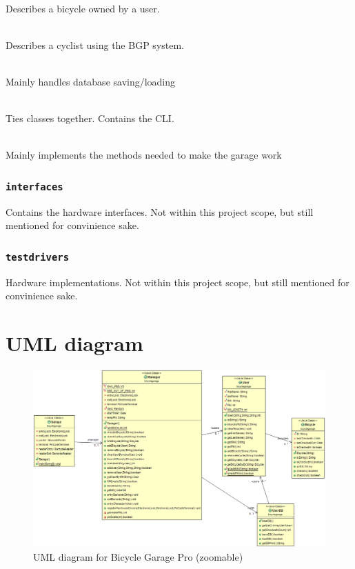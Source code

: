 \documentclass[12pt,titlepage]{article}
\begin{document}
\begin{description}[font=\normalfont]
	\item [\texttt{Bicycle}]	\hfill \\
		Describes a bicycle owned by a user.

	\item [\texttt{User}]		\hfill \\
		Describes a cyclist using the BGP system.

	\item [\texttt{UserDB}]		\hfill \\
		Mainly handles database saving/loading

	\item [\texttt{Garage}]		\hfill \\
		Ties classes together. Contains the CLI.

	\item [\texttt{Manager}]	\hfill \\
		Mainly implements the methods needed to make the garage work

\end{description}


\subsubsection{\texttt{interfaces}}
Contains the hardware interfaces. Not within this project scope, but still mentioned for convinience sake.
\subsubsection{\texttt{testdrivers}}
Hardware implementations. Not within this project scope, but still mentioned for convinience sake.



\newpage
\appendix

\section{UML diagram}
\label{app:example-appendix-section}
\begin{figure}[!h]
\centering
\includegraphics[width=\textwidth]{BGP.png}
\caption{UML diagram for Bicycle Garage Pro (zoomable)}
\label{fig:lol}
\end{figure}
\end{document}
